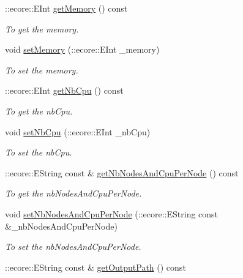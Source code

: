 \begin{DoxyCompactItemize}
::ecore::EInt \hyperlink{classTMS__Data_1_1SubmitOptions_a17c2a0eead72d2d1bd0c8186289e3227}{getMemory} () const 
\begin{DoxyCompactList}\small\item\em To get the memory. \item\end{DoxyCompactList}\item 
void \hyperlink{classTMS__Data_1_1SubmitOptions_a9c4e79cbf99636b3c704a20d6399316e}{setMemory} (::ecore::EInt \_\-memory)
\begin{DoxyCompactList}\small\item\em To set the memory. \item\end{DoxyCompactList}\item 
::ecore::EInt \hyperlink{classTMS__Data_1_1SubmitOptions_a10a64275212a381f3e224ec49cc82f06}{getNbCpu} () const 
\begin{DoxyCompactList}\small\item\em To get the nbCpu. \item\end{DoxyCompactList}\item 
void \hyperlink{classTMS__Data_1_1SubmitOptions_a60094a13b4f82449d02c09f2c09a2ba8}{setNbCpu} (::ecore::EInt \_\-nbCpu)
\begin{DoxyCompactList}\small\item\em To set the nbCpu. \item\end{DoxyCompactList}\item 
::ecore::EString const \& \hyperlink{classTMS__Data_1_1SubmitOptions_a831833420ddb5f678bfef9b68d72e06f}{getNbNodesAndCpuPerNode} () const 
\begin{DoxyCompactList}\small\item\em To get the nbNodesAndCpuPerNode. \item\end{DoxyCompactList}\item 
void \hyperlink{classTMS__Data_1_1SubmitOptions_a8aed47f0ee702678dffd834a1f6bbc6a}{setNbNodesAndCpuPerNode} (::ecore::EString const \&\_\-nbNodesAndCpuPerNode)
\begin{DoxyCompactList}\small\item\em To set the nbNodesAndCpuPerNode. \item\end{DoxyCompactList}\item 
::ecore::EString const \& \hyperlink{classTMS__Data_1_1SubmitOptions_abb8340cd1d657d5c033da2fbd7f827e5}{getOutputPath} () const 

\end{DoxyCompactItemize}
